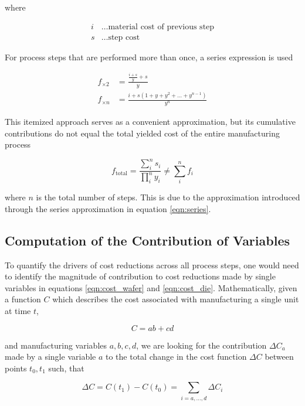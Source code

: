 \documentclass[10pt]{article}
\begin{document}
where

\begin{align*}
    i &\dots \text{material cost of previous step} \\
    s &\dots \text{step cost}
\end{align*}

For process steps that are performed more than once, a series expression is used

\begin{align}
\label{eqn:series}
    f_{\times 2} &=  \frac{\frac{i+s}{y}+s}{y} \\
    f_{\times n} &= \frac{i + s(1+y+y^2+ \dots + y^{n-1})}{y^n}
\end{align}

This itemized approach serves as a convenient approximation, but its cumulative contributions do not equal the total yielded cost of the entire manufacturing process

\begin{equation}
    f_\text{total} = \frac{\sum_i^n s_i}{\prod_i^ny_i} \neq \sum_i^n f_i
\end{equation}

where $n$ is the total number of steps. This is due to the approximation introduced through the series approximation in equation \ref{eqn:series}.

\subsection{Computation of the Contribution of Variables}

To quantify the drivers of cost reductions across all process steps, one would need to identify the magnitude of contribution to cost reductions made by single variables in equations \ref{eqn:cost_wafer} and \ref{eqn:cost_die}. Mathematically, given a function $C$ which describes the cost associated with manufacturing a single unit at time $t$,

\begin{equation}
C=ab+cd
\end{equation}

and manufacturing variables $a,b,c,d$, we are looking for the contribution $\Delta C_{a}$ made by a single variable $a$ to the total change in the cost function $\Delta C$ between points $t_0,t_1$ such, that

\begin{equation}
\Delta C = C(t_1)-C(t_0) = \sum_{i=a, \dots, d} \Delta C_i
\end{equation}
\end{document}
